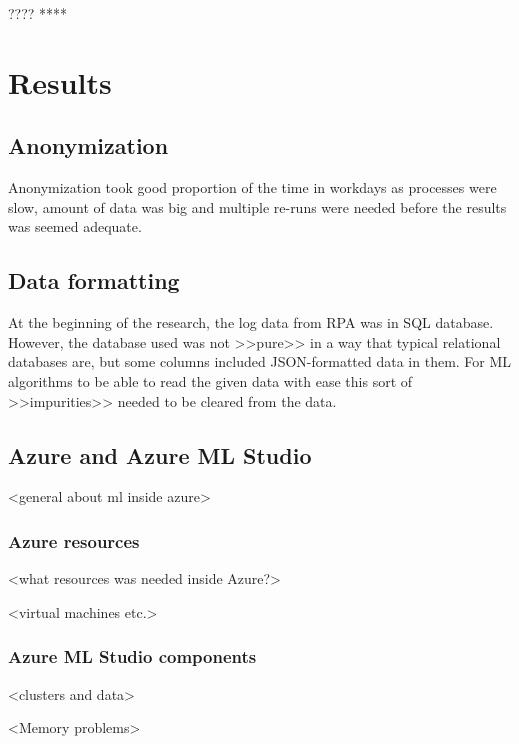 \documentclass[english, 12pt, a4paper, elec, utf8, a-1b, online]{aaltothesis}
\begin{document}
???? ****


\clearpage




\section{Results}\label{sec:results}

\subsection{Anonymization}\label{subsec:anonymization}
Anonymization took good proportion of the time in workdays
as processes were slow,
amount of data was big
and multiple re-runs were needed
before the results was seemed adequate.


\subsection{Data formatting}\label{subsec:data-formatting}
At the beginning of the research,
the log data from RPA was in SQL database.
However,
the database used was not >>pure>>
in a way that typical relational databases are,
but some columns included JSON-formatted data in them.
For ML algorithms to be able to read the given data with ease
this sort of >>impurities>> needed to be cleared from the data.


\subsection{Azure and Azure ML Studio}\label{subsec:azure-and-azure-ml-studio}

<general about ml inside azure>

\subsubsection*{Azure resources}

<what resources was needed inside Azure?>

<virtual machines etc.>




\subsubsection*{Azure ML Studio components}
<clusters and data>

<Memory problems>
\end{document}
